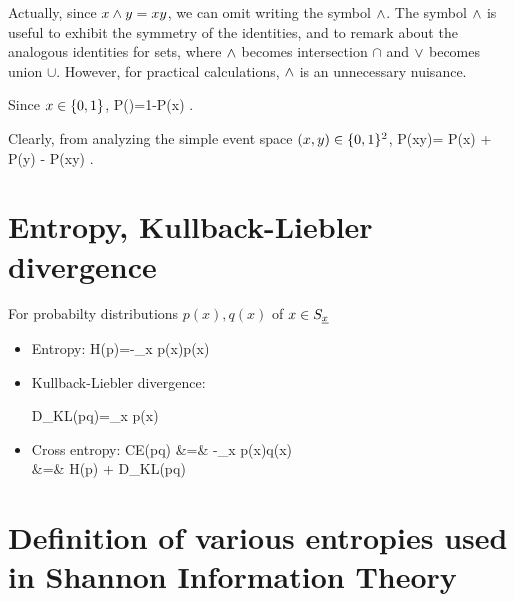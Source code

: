 Actually, since
$x\wedge y=xy$, we can omit writing
the symbol $\wedge$. The symbol
$\wedge$ is useful to
exhibit the symmetry
of the identities, and
to remark
about
the analogous identities
for sets, where
$\wedge$ becomes intersection $\cap$
and $\vee$ becomes union $\cup$. However,
for practical calculations,
$\wedge$ is an unnecessary nuisance.

Since $x\in \{0,1\}$,
\beq
P()=1-P(x)
\;.
\eeq

Clearly, from analyzing
the simple event space $(x,y)\in \{0,1\}^2$,
\beq
P(x\V y)= P(x) + P(y) - P(x\A y)
\;.
\eeq

\section{Entropy, Kullback-Liebler divergence}

For probabilty distributions $p(x), q(x)$ of $x\in S_{\underline{x}}$
\begin{itemize}
\item 
Entropy:
\beq
H(p)=-\sum_x p(x)\ln p(x)
\eeq

\item
Kullback-Liebler divergence:

\beq
D_{KL}(p\parallel q)=\sum_{x} p(x)\ln {}
\eeq
\item 
Cross entropy:
\beqa
CE(p\rarrow q) &=& -\sum_x p(x)\ln q(x)\\
&=& H(p) + D_{KL}(p\parallel q)
\eeqa
\end{itemize}

\section{Definition of various
entropies used in Shannon Information Theory}

